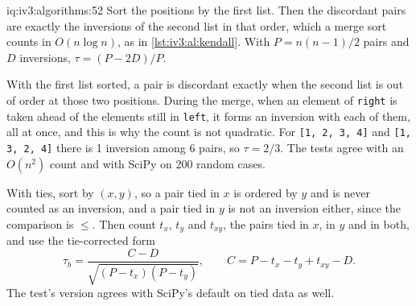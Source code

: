 \begin{solution}{iq:iv3:algorithms:52}
Sort the positions by the first list. Then the discordant pairs are exactly the inversions of the second list in that order, which a merge sort counts in $O(n \log n)$, as in \cref{lst:iv3:al:kendall}. With $P = n(n-1)/2$ pairs and $D$ inversions, $\tau = (P - 2D)/P$.
\label{lst:iv3:al:kendall}

With the first list sorted, a pair is discordant exactly when the second list is out of order at those two positions. During the merge, when an element of \texttt{right} is taken ahead of the elements still in \texttt{left}, it forms an inversion with each of them, all at once, and this is why the count is not quadratic. For \texttt{[1, 2, 3, 4]} and \texttt{[1, 3, 2, 4]} there is 1 inversion among 6 pairs, so $\tau = 2/3$. The tests agree with an $O(n^2)$ count and with SciPy on 200 random cases.

With ties, sort by $(x, y)$, so a pair tied in $x$ is ordered by $y$ and is never counted as an inversion, and a pair tied in $y$ is not an inversion either, since the comparison is $\le$. Then count $t_x$, $t_y$ and $t_{xy}$, the pairs tied in $x$, in $y$ and in both, and use the tie-corrected form
\[
\tau_b = \frac{C - D}{\sqrt{(P - t_x)(P - t_y)}}, \qquad C = P - t_x - t_y + t_{xy} - D.
\]
The test's version agrees with SciPy's default on tied data as well.

\end{solution}

